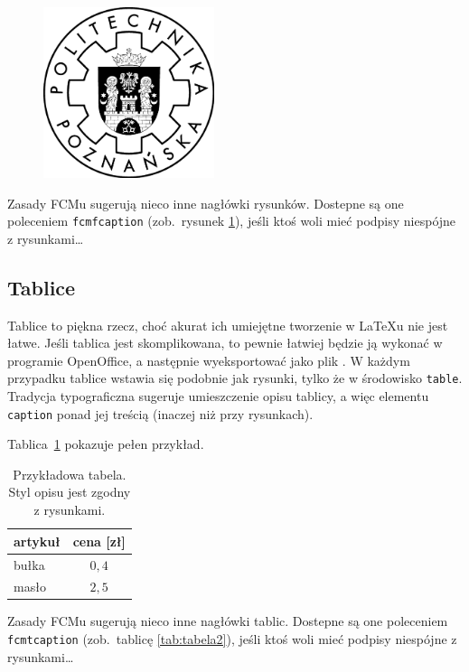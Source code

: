 \begin{figure}[t]
    \centering\includegraphics[width=5cm]{figures/template/logo-pp}
    \label{rys:plama2}
\end{figure}

Zasady FCMu sugerują nieco inne nagłówki rysunków. Dostepne są one poleceniem \texttt{fcmfcaption} (zob.~rysunek
\ref{rys:plama2}), jeśli ktoś woli mieć podpisy niespójne z rysunkami\ldots

\subsection{Tablice}

Tablice to piękna rzecz, choć akurat ich umiejętne tworzenie w \LaTeX{}u nie jest łatwe.
Jeśli tablica jest skomplikowana, to pewnie łatwiej będzie ją wykonać w programie
OpenOffice, a następnie wyeksportować jako plik . W każdym przypadku tablice wstawia się podobnie
jak rysunki, tylko że w środowisko \texttt{table}. Tradycja typograficzna sugeruje umieszczenie opisu tablicy, a więc
elementu \texttt{caption} ponad jej treścią (inaczej niż przy rysunkach).

Tablica~\ref{tab:tabela} pokazuje pełen przykład.

\begin{table}[h]
    \caption{Przykładowa tabela. Styl opisu jest zgodny z rysunkami.}\label{tab:tabela}
    \centering\footnotesize%
    \begin{tabular}{l c}
        \toprule
        artykuł & cena [zł] \\
        \midrule
        bułka & $0,4$ \\
        masło & $2,5$ \\
        \bottomrule
    \end{tabular}
\end{table}

Zasady FCMu sugerują nieco inne nagłówki tablic. Dostepne są one poleceniem \texttt{fcmtcaption} (zob.~tablicę
\ref{tab:tabela2}), jeśli ktoś woli mieć podpisy niespójne z rysunkami\ldots

